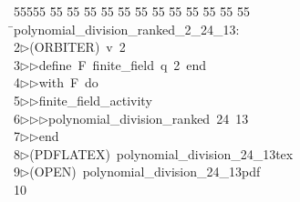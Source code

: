 %
%
\begin{tabbing}
55555 \= 55 \= 55 \= 55 \= 55 \= 55 \= 55 \= 55 \= 55 \= 55 \= 55 \= 55 \= 55 \= \>polynomial\_division\_ranked\_2\_24\_13:\\[0pt]
2\>$\triangleright$\>(ORBITER)\ v\ 2\ \\[0pt]
3\>$\triangleright$\>$\triangleright$\>define\ F\ finite\_field\ q\ 2\ end\ \\[0pt]
4\>$\triangleright$\>$\triangleright$\>with\ F\ do\ \\[0pt]
5\>$\triangleright$\>$\triangleright$\>finite\_field\_activity\ \\[0pt]
6\>$\triangleright$\>$\triangleright$\>$\triangleright$\>polynomial\_division\_ranked\ 24\ 13\ \\[0pt]
7\>$\triangleright$\>$\triangleright$\>end\\[0pt]
8\>$\triangleright$\>(PDFLATEX)\ polynomial\_division\_24\_13tex\\[0pt]
9\>$\triangleright$\>(OPEN)\ polynomial\_division\_24\_13pdf\\[0pt]
10\>\end{tabbing}
